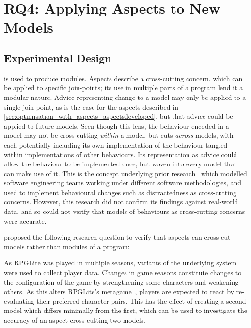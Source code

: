 \section{RQ4: Applying Aspects to New Models}
\label{sec:rq4}


\subsection{Experimental Design}


\Aop{} is used to produce modules. Aspects describe a cross-cutting concern,
which can be applied to specific join-points; its use in multiple parts of a
program lend it a modular nature. Advice representing change to a model may only
be applied to a single join-point, as is the case for the aspects described in
\cref{sec:optimisation_with_aspects_aspectsdeveloped}, but that advice could be
applied to future models. Seen though this lens, the behaviour encoded in a
model may not be cross-cutting \emph{within} a model, but cuts \emph{across}
models, with each potentially including its own implementation of the behaviour
tangled within implementations of other behaviours. Its representation as advice
could allow the behaviour to be implemented once, but woven into every model
that can make use of it. This is the concept underlying prior
research~\cite{wallis2018caise} which modelled software engineering teams
working under different software methodologies, and used \aop{} to implement
behavioural changes such as distractedness as cross-cutting concerns. However,
this research did not confirm its findings against real-world data, and so could
not verify that models of behaviours as cross-cutting concerns were accurate.

 proposed the following research question to verify that
aspects can cross-cut models rather than modules of a program:

\begin{researchquestion}
  \rqfour{}
\end{researchquestion}

As RPGLite was played in multiple seasons, variants of the underlying system
were used to collect player data. Changes in game seasons constitute changes to
the configuration of the game by strengthening some characters and weakening
others. As this alters RPGLite's metagame~\cite{kavanagh2021thesis}, players are
expected to react by re-evaluating their preferred character pairs. This has the
effect of creating a second model which differs minimally from the first, which
can be used to investigate the accuracy of an aspect cross-cutting two models.

